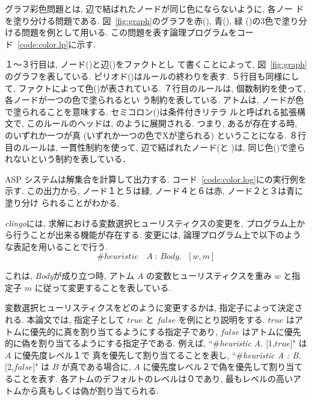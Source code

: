 グラフ彩色問題とは, 辺で結ばれたノードが同じ色にならないように, 各ノー
ドを塗り分ける問題である. 
図~\ref{fig:graph}のグラフを赤(), 青(), 緑
()の3色で塗り分ける問題を例として用いる. 
この問題を表す論理プログラムをコード~\ref{code:color.lp}に示す. 

１〜３行目は, ノード()と辺()をファクトとし
て書くことによって, 図~\ref{fig:graph}のグラフを表している. 
ピリオド()はルールの終わりを表す. 
５行目も同様にして, ファクトによって色()が表されている. 
%
７行目のルールは, 個数制約を使って, 各ノードが一つの色で塗られるとい
う制約を表している. アトムは, ノードが色
で塗られることを意味する. セミコロン(\code{:})は条件付きリテラ
ルと呼ばれる拡張構文で, このルールのヘッドは, 
のように展開される. 
つまり, あるが存在する時, \\
のいずれか一つが真 (いずれか一つの色でXが塗られる) ということになる. 
８行目のルールは, 一貫性制約を使って, 辺で結ばれたノード(と
)は, 同じ色()で塗られないという制約を表している．

ASP システムは解集合を計算して出力する. 
コード~\ref{code:color.log}に{\clingo}の実行例を示す. 
この出力から, ノード１と５は緑, ノード４と６は赤, ノード２と３は青に塗り分け
られることがわかる. 

\textit{clingo}には, 求解における変数選択ヒューリスティクスの変更を, 
プログラム上から行うことが出来る機能が存在する. 
変更には, 論理プログラム上で以下のような表記を用いることで行う. 
\begin{displaymath}
\#heuristic \quad A~ : ~Body. ~~~[w,m]
\end{displaymath}

これは, \textit{Body}が成り立つ時, アトム $A$ の変数ヒューリスティクスを重み
 $w$ と指定子 $m$ に従って変更することを表している. 

変数選択ヒューリスティクスをどのように変更するかは, 指定子によって決定される. 
本論文では, 指定子として $true$ と $false$ を例にとり説明をする. 
$true$ はアトムに優先的に真を割り当てるようにする指定子であり, 
$false$ はアトムに優先的に偽を割り当てるようにする指定子である. 
例えば, ``\#\textit{heuristic A.} [1,$true$]" は $A$ に優先度レベル１で
真を優先して割り当てることを表し, 
``\#\textit{heuristic A : B.} [2,$false$]" は $B$ が真である場合に, 
$A$ に優先度レベル２で偽を優先して割り当てることを表す. 
各アトムのデフォルトのレベルは０であり, 
最もレベルの高いアトムから真もしくは偽が割り当てられる. 

